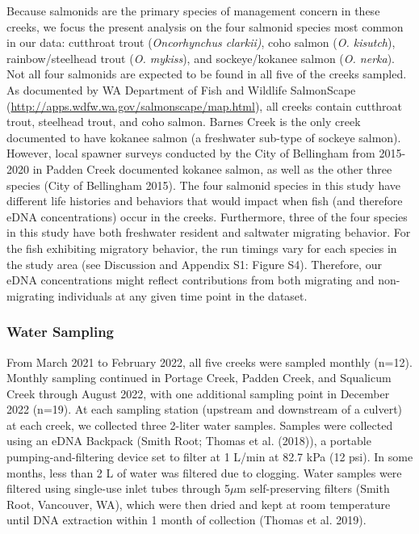 \documentclass[
]{article}
\begin{document}
Because salmonids are the primary species of management concern in these
creeks, we focus the present analysis on the four salmonid species most
common in our data: cutthroat trout (\emph{Oncorhynchus clarkii)}, coho
salmon (\emph{O. kisutch}), rainbow/steelhead trout (\emph{O. mykiss}),
and sockeye/kokanee salmon (\emph{O. nerka}). Not all four salmonids are
expected to be found in all five of the creeks sampled. As documented by
WA Department of Fish and Wildlife SalmonScape
(\url{http://apps.wdfw.wa.gov/salmonscape/map.html}), all creeks contain
cutthroat trout, steelhead trout, and coho salmon. Barnes Creek is the
only creek documented to have kokanee salmon (a freshwater sub-type of
sockeye salmon). However, local spawner surveys conducted by the City of
Bellingham from 2015-2020 in Padden Creek documented kokanee salmon, as
well as the other three species (City of Bellingham 2015). The four
salmonid species in this study have different life histories and
behaviors that would impact when fish (and therefore eDNA
concentrations) occur in the creeks. Furthermore, three of the four
species in this study have both freshwater resident and saltwater
migrating behavior. For the fish exhibiting migratory behavior, the run
timings vary for each species in the study area (see Discussion and
Appendix S1: Figure S4). Therefore, our eDNA concentrations might
reflect contributions from both migrating and non-migrating individuals
at any given time point in the dataset.

\hypertarget{water-sampling}{%
\subsubsection{Water Sampling}\label{water-sampling}}

From March 2021 to February 2022, all five creeks were sampled monthly
(n=12). Monthly sampling continued in Portage Creek, Padden Creek, and
Squalicum Creek through August 2022, with one additional sampling point
in December 2022 (n=19). At each sampling station (upstream and
downstream of a culvert) at each creek, we collected three 2-liter water
samples. Samples were collected using an eDNA Backpack (Smith Root;
Thomas et al. (2018)), a portable pumping-and-filtering device set to
filter at 1 L/min at 82.7 kPa (12 psi). In some months, less than 2 L of
water was filtered due to clogging. Water samples were filtered using
single-use inlet tubes through 5\(\mu\)m self-preserving filters (Smith
Root, Vancouver, WA), which were then dried and kept at room temperature
until DNA extraction within 1 month of collection (Thomas et al. 2019).
\end{document}
